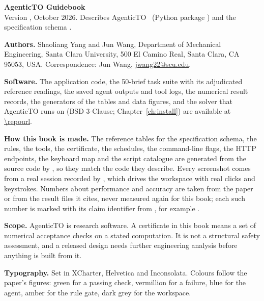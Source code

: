 \thispagestyle{empty}
\vspace*{\fill}
{\small\sffamily
\textbf{AgenticTO Guidebook}\\
Version \AgenticVersion, October 2026. Describes AgenticTO \AgenticVersion\ (Python package ) and the
specification schema .

\medskip
\textbf{Authors.} Shaoliang Yang and Jun Wang, Department of Mechanical Engineering, Santa Clara University,
500 El Camino Real, Santa Clara, CA 95053, USA. Correspondence: Jun Wang, \href{mailto:jwang22@scu.edu}{jwang22@scu.edu}.

\medskip
\textbf{Software.} The application code, the 50-brief task suite with its adjudicated reference readings, the saved
agent outputs and tool logs, the numerical result records, the generators of the tables and data figures, and the
 solver that AgenticTO runs on (BSD 3-Clause; Chapter~\ref{ch:install}) are available at \url{\repourl}.

\medskip
\textbf{How this book is made.} The reference tables for the specification schema, the rules, the tools, the certificate,
the schedules, the command-line flags, the HTTP endpoints, the keyboard map and the script catalogue are generated from
the source code by , so they match the code they describe. Every screenshot comes from a
real session recorded by , which drives the workspace with real clicks and keystrokes.
Numbers about performance and accuracy are taken from the paper or from the result files it cites, never measured
again for this book; each such number is marked with its claim identifier from , for
example .

\medskip
\textbf{Scope.} AgenticTO is research software. A certificate in this book means a set of numerical acceptance checks
on a stated computation. It is not a structural safety assessment, and a released design needs further engineering
analysis before anything is built from it.

\medskip
\textbf{Typography.} Set in XCharter, Helvetica and Inconsolata. Colours follow the paper's figures: green for a passing
check, vermillion for a failure, blue for the agent, amber for the rule gate, dark grey for the workspace.
}
\clearpage
